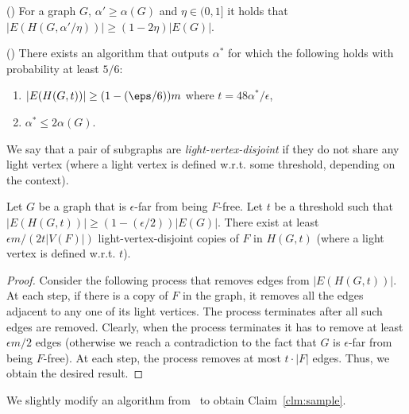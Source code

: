 \begin{claim}\label{clm:arb}(\cite{})
For a graph $G$, $\alpha' \geq \alpha(G)$ and $\eta\in (0,1]$ it holds that $|E(H(G, \alpha'/\eta))| \geq (1-2\eta)|E(G)|$.
\end{claim}


\begin{claim}\label{lem:alpha}(\cite{})
There exists an algorithm that outputs $\alpha^*$ for which the following holds with probability at least $5/6$:
\begin{enumerate}
\item $|E(H(G, t))| \geq (1-(\eps/6))m$ where $t = 48\alpha^*/\epsilon$,
\item $\alpha^* \leq 2 \alpha(G)$.
\end{enumerate}
\end{claim} 

We say that a pair of subgraphs are {\em light-vertex-disjoint} if they do not share any light vertex (where a light vertex is defined w.r.t. some threshold, depending on the context). 

\begin{claim}\label{clm:disjoint}
Let $G$ be a graph that is $\epsilon$-far from being $F$-free. Let $t$ be a threshold such that $|E(H(G, t))| \geq (1-(\epsilon/2)) |E(G)|$. There exist at least $\epsilon m/ (2t |V(F)|)$ light-vertex-disjoint copies of $F$ in $H(G, t)$ (where a light vertex is defined w.r.t. $t$).
\end{claim}
\begin{proof}
Consider the following process that removes edges from $|E(H(G, t))|$. At each step, if there is a copy of $F$ in the graph, it removes all the edges adjacent to any one of its light vertices. The process terminates after all such edges are removed. Clearly, when the process terminates it has to remove at least $\epsilon m /2$ edges (otherwise we reach a contradiction to the fact that $G$ is $\epsilon$-far from being $F$-free).
At each step, the process removes at most $t \cdot |F|$ edges. Thus, we obtain the desired result. 
\end{proof}


\medskip
We slightly modify an algorithm from~\cite{} to obtain Claim~\ref{clm:sample}. 

